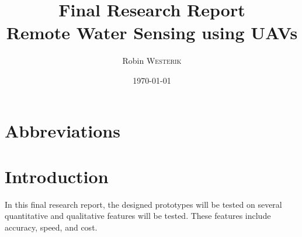 \documentclass[11pt, a4paper]{article}
\title{Final Research Report\\Remote Water Sensing using UAVs}
\author{Robin \textsc{Westerik}}
\date{\today}
\begin{document}



\tableofcontents
\pagebreak

\section{Abbreviations}
\sffamily\footnotesize
\printnomenclature
\rmfamily\normalsize

\section{Introduction}

In this final research report, the designed prototypes will be tested on several quantitative and qualitative features will be tested. These
features include accuracy, speed, and cost. 




\pagebreak
\printbibliography 
\end{document}
